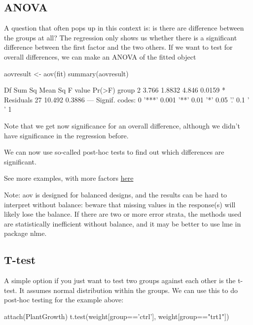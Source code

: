 \documentclass[a4paper,twoside]{tufte-book}\usepackage[]{graphicx}\usepackage[]{color}
\begin{document}
\begin{appendices}
\subsection{ANOVA}

A question that often pops up in this context is: is there are difference between the groups at all? The regression only shows us whether there is a significant difference between the first factor and the two others. If we want to test for overall differences, we can make an ANOVA of the fitted object

\begin{Schunk}
\begin{Sinput}
aovresult <- aov(fit)
summary(aovresult)
\end{Sinput}
\begin{Soutput}
            Df Sum Sq Mean Sq F value Pr(>F)  
group        2  3.766  1.8832   4.846 0.0159 *
Residuals   27 10.492  0.3886                 
---
Signif. codes:  0 '***' 0.001 '**' 0.01 '*' 0.05 '.' 0.1 ' ' 1
\end{Soutput}
\end{Schunk}

Note that we get now significance for an overall difference, although we didn't have significance in the regression before. 

We can now use so-called post-hoc tests to find out which differences are significant.

See more examples, with more factors \href{http://www.statmethods.net/stats/anova.html}{here} 

Note: aov is designed for balanced designs, and the results can be hard to interpret without balance: beware that missing values in the response(s) will likely lose the balance. If there are two or more error strata, the methods used are statistically inefficient without balance, and it may be better to use lme in package nlme.

\subsection{T-test}

A simple option if you just want to test two groups against each other is the t-test. It assumes normal distribution within the groups. We can use this to do post-hoc testing for the example above: 

\begin{Schunk}
\begin{Sinput}
attach(PlantGrowth)
t.test(weight[group=='ctrl'], weight[group=="trt1"])
\end{Sinput}
\begin{Soutput}


\end{Soutput}
\end{Schunk}
\end{appendices}
\end{document}
